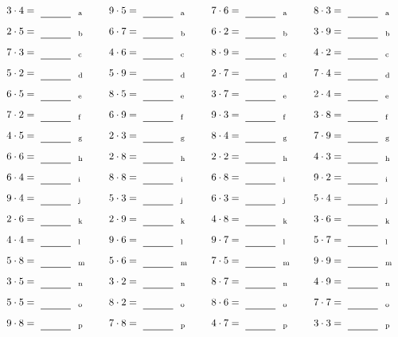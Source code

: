 \documentclass
[
  draft    = true,
  fontsize = 11pt,
  parskip  = half-
]
{scrartcl}
\begin{document}
\par\vfill\par
\begin{align*}
    \pline{3\cdot4}&=\rline{a}
  & \pline{9\cdot5}&=\rline{a}
  & \pline{7\cdot6}&=\rline{a}
  & \pline{8\cdot3}&=\rline{a} \\[1ex]
    \pline{2\cdot5}&=\rline{b}
  & \pline{6\cdot7}&=\rline{b}
  & \pline{6\cdot2}&=\rline{b}
  & \pline{3\cdot9}&=\rline{b} \\[1ex]
    \pline{7\cdot3}&=\rline{c}
  & \pline{4\cdot6}&=\rline{c}
  & \pline{8\cdot9}&=\rline{c}
  & \pline{4\cdot2}&=\rline{c} \\[1ex]
    \pline{5\cdot2}&=\rline{d}
  & \pline{5\cdot9}&=\rline{d}
  & \pline{2\cdot7}&=\rline{d}
  & \pline{7\cdot4}&=\rline{d} \\[1ex]
    \pline{6\cdot5}&=\rline{e}
  & \pline{8\cdot5}&=\rline{e}
  & \pline{3\cdot7}&=\rline{e}
  & \pline{2\cdot4}&=\rline{e} \\[1ex]
    \pline{7\cdot2}&=\rline{f}
  & \pline{6\cdot9}&=\rline{f}
  & \pline{9\cdot3}&=\rline{f}
  & \pline{3\cdot8}&=\rline{f} \\[1ex]
    \pline{4\cdot5}&=\rline{g}
  & \pline{2\cdot3}&=\rline{g}
  & \pline{8\cdot4}&=\rline{g}
  & \pline{7\cdot9}&=\rline{g} \\[1ex]
    \pline{6\cdot6}&=\rline{h}
  & \pline{2\cdot8}&=\rline{h}
  & \pline{2\cdot2}&=\rline{h}
  & \pline{4\cdot3}&=\rline{h} \\[1ex]
    \pline{6\cdot4}&=\rline{i}
  & \pline{8\cdot8}&=\rline{i}
  & \pline{6\cdot8}&=\rline{i}
  & \pline{9\cdot2}&=\rline{i} \\[1ex]
    \pline{9\cdot4}&=\rline{j}
  & \pline{5\cdot3}&=\rline{j}
  & \pline{6\cdot3}&=\rline{j}
  & \pline{5\cdot4}&=\rline{j} \\[1ex]
    \pline{2\cdot6}&=\rline{k}
  & \pline{2\cdot9}&=\rline{k}
  & \pline{4\cdot8}&=\rline{k}
  & \pline{3\cdot6}&=\rline{k} \\[1ex]
    \pline{4\cdot4}&=\rline{l}
  & \pline{9\cdot6}&=\rline{l}
  & \pline{9\cdot7}&=\rline{l}
  & \pline{5\cdot7}&=\rline{l} \\[1ex]
    \pline{5\cdot8}&=\rline{m}
  & \pline{5\cdot6}&=\rline{m}
  & \pline{7\cdot5}&=\rline{m}
  & \pline{9\cdot9}&=\rline{m} \\[1ex]
    \pline{3\cdot5}&=\rline{n}
  & \pline{3\cdot2}&=\rline{n}
  & \pline{8\cdot7}&=\rline{n}
  & \pline{4\cdot9}&=\rline{n} \\[1ex]
    \pline{5\cdot5}&=\rline{o}
  & \pline{8\cdot2}&=\rline{o}
  & \pline{8\cdot6}&=\rline{o}
  & \pline{7\cdot7}&=\rline{o} \\[1ex]
    \pline{9\cdot8}&=\rline{p}
  & \pline{7\cdot8}&=\rline{p}
  & \pline{4\cdot7}&=\rline{p}
  & \pline{3\cdot3}&=\rline{p}
\end{align*}
\end{document}
